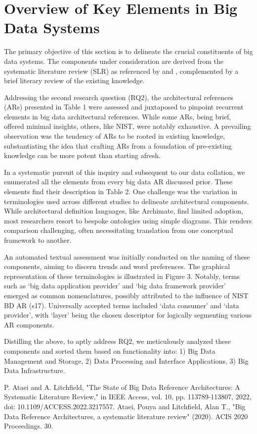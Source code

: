 \documentclass[conference]{IEEEtran}
\begin{document}
\section{Overview of Key Elements in Big Data Systems}

The primary objective of this section is to delineate the crucial constituents of big data systems. The components under consideration are derived from the systematic literature review (SLR) as referenced by \cite{b1} and \cite{b2}, complemented by a brief literary review of the existing knowledge.

Addressing the second research question (RQ2), the architectural references (ARs) presented in Table 1 were assessed and juxtaposed to pinpoint recurrent elements in big data architectural references. While some ARs, being brief, offered minimal insights, others, like NIST, were notably exhaustive. A prevailing observation was the tendency of ARs to be rooted in existing knowledge, substantiating the idea that crafting ARs from a foundation of pre-existing knowledge can be more potent than starting afresh.

In a systematic pursuit of this inquiry and subsequent to our data collation, we enumerated all the elements from every big data AR discussed prior. These elements find their description in Table 2. One challenge was the variation in terminologies used across different studies to delineate architectural components. While architectural definition languages, like Archimate, find limited adoption, most researchers resort to bespoke ontologies using simple diagrams. This renders comparison challenging, often necessitating translation from one conceptual framework to another.

An automated textual assessment was initially conducted on the naming of these components, aiming to discern trends and word preferences. The graphical representation of these terminologies is illustrated in Figure 3. Notably, terms such as ‘big data application provider’ and ‘big data framework provider’ emerged as common nomenclatures, possibly attributed to the influence of NIST BD AR (s17). Universally accepted terms included ‘data consumer’ and ‘data provider’, with ‘layer’ being the chosen descriptor for logically segmenting various AR components.

Distilling the above, to aptly address RQ2, we meticulously analyzed these components and sorted them based on functionality into: 1) Big Data Management and Storage, 2) Data Processing and Interface Applications, 3) Big Data Infrastructure.




\begin{thebibliography}{00}


 P. Ataei and A. Litchfield, "The State of Big Data Reference Architectures: A Systematic Literature Review," in IEEE Access, vol. 10, pp. 113789-113807, 2022, doi: 10.1109/ACCESS.2022.3217557.
 Ataei, Pouya and Litchfield, Alan T., "Big Data Reference Architectures, a systematic literature review" (2020). ACIS 2020 Proceedings. 30.



\end{thebibliography}
\end{document}

